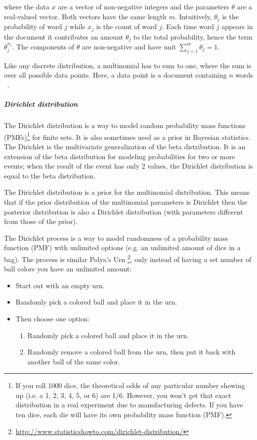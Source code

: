 \documentclass[12pt]{report}
\begin{document}
where the data $x$ are a vector of non-negative integers and the parameters
$\theta$ are a real-valued vector. Both vectors have the same length $m$.
Intuitively, $\theta_j$ is the probability of word $j$ while $x_j$ is the count
of word $j$. Each time word $j$ appears in the document it contributes an amount
$\theta_j$ to the total probability, hence the term $\theta_j^{x_j}$. The
components of $\theta$ are non-negative and have unit $\sum\limits_{j=1}^m
\theta_j = 1$.

Like any discrete distribution, a multinomial has to sum to one, where the sum
is over all possible data points. Here, a data point is a document containing
$n$ words ~\cite{Huang_maximumlikelihood}.


\subparagraph{Dirichlet distribution}

The Dirichlet distribution is a way to model random probability mass functions
(PMFs)\footnote{If you roll 1000 dice, the theoretical odds of any particular
number showing up (i.e. a 1, 2, 3, 4, 5, or 6) are 1/6. However, you won’t get
that exact distribution in a real experiment due to manufacturing defects. If
you have ten dice, each die will have its own probability mass function (PMF).}
for finite sets. It is also sometimes used as a prior in Bayesian statistics.
The Dirichlet is the multivariate generalization of the beta distribution. It
is an extension of the beta distribution for modeling probabilities for two or
more events; when the result of the event has only 2 values, the Dirichlet
distribution is equal to the beta distribution.

The Dirichlet distribution is a prior for the multinomial distribution. This
means that if the prior distribution of the multinomial parameters is Dirichlet
then the posterior distribution is also a Dirichlet distribution (with
parameters different from those of the prior).

The Dirichlet process is a way to model randomness of a probability mass
function (PMF) with unlimited options (e.g. an unlimited amount of dice in a
bag). The process is similar Polya’s Urn \footnote{\url{http://www.statisticshowto.com/dirichlet-distribution/}}, only instead of having a set number
of ball colors you have an unlimited amount:

\begin{itemize}
\item Start out with an empty urn.
\item Randomly pick a colored ball and place it in the urn.
\item Then choose one option:
\begin{enumerate}
\item Randomly pick a colored ball and place it in the urn.
\item Randomly remove a colored ball from the urn, then put it back with another 
ball of the same color.
\end{enumerate}
\end{itemize}
 
\end{document}
